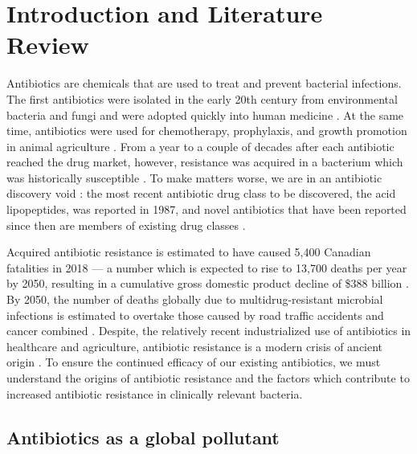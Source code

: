 \chapter{Introduction and Literature Review}

Antibiotics are chemicals that are used to treat and prevent bacterial infections.
The first antibiotics were isolated in the early 20th century from environmental bacteria and fungi and were adopted quickly into human medicine \parencite{Hutchings.2019}.
At the same time, antibiotics were used for chemotherapy, prophylaxis, and growth promotion in animal agriculture \parencite{Kirchhelle.2018}.
From a year to a couple of decades after each antibiotic reached the drug market, however, resistance was acquired in a bacterium which was historically susceptible \parencite{Ventola.2015}.
To make matters worse, we are in an antibiotic discovery void \parencite{Silver.2011}:
the most recent antibiotic drug class to be discovered, the acid lipopeptides, was reported in 1987, and novel antibiotics that have been reported since then are members of existing drug classes \parencite{Debono.1987}.

Acquired antibiotic resistance is estimated to have caused 5,400 Canadian fatalities in 2018 --- a number which is expected to rise to 13,700 deaths per year by 2050, resulting in a cumulative gross domestic product decline of \$388 billion \parencite{Finlay.2019}.
By 2050, the number of deaths globally due to multidrug-resistant microbial infections is estimated to overtake those caused by road traffic accidents and cancer combined \parencite{ONeill.2016}. Despite, the relatively recent industrialized use of antibiotics in healthcare and agriculture, antibiotic resistance is a modern crisis of ancient origin \parencite{DCosta.2011}.
To ensure the continued efficacy of our existing antibiotics, we must understand the origins of antibiotic resistance and the factors which contribute to increased antibiotic resistance in clinically relevant bacteria.

\section{Antibiotics as a global pollutant}

